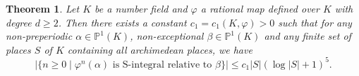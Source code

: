 \documentclass[10pt, reqno]{amsart}
\newcommand{\bb}{\mathbb}
\newcommand{\vphi}{\varphi}
\newtheorem{theorem}{Theorem}
\numberwithin{theorem}{section}
\numberwithin{equation}{section}
\numberwithin{example}{section}
\numberwithin{definition}{section}
\begin{document}
\begin{theorem} \label{IntroTheorem1}
Let $K$ be a number field and $\vphi$ a rational map defined over $K$ with degree $d \geq 2$. Then there exists a constant $c_1 = c_1(K,\vphi) > 0$ such that for any non-preperiodic $\alpha \in \bb{P}^1(K)$, non-exceptional $\beta \in \bb{P}^1(K)$ and any finite set of places $S$ of $K$ containing all archimedean places, we have
$$\left| \{ n \geq 0 \mid \vphi^n(\alpha) \text{ is S-integral relative to } \beta \} \right| \leq c_1 |S| (\log |S|+1)^5.$$
\end{theorem}




 
\end{document}
